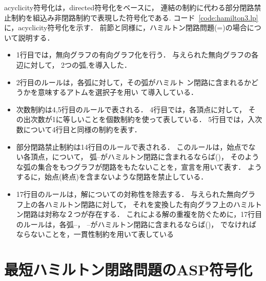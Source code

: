 \textsf{acyclicity}符号化は，\textsf{directed}符号化をベースに，
連結の制約に代わる部分閉路禁止制約を組込み非閉路制約で表現した符号化である.
コード~\ref{code:hamilton3.lp}に，\textsf{acyclicity}符号化を示す．
前節と同様に，ハミルトン閉路問題(=)の場合について説明する．

\begin{itemize}
\item 1行目では，無向グラフの有向グラフ化を行う．
  与えられた無向グラフの各辺に対して，
  2つの弧,を導入した．
\item 2行目のルールは，各弧に対して，その弧がハミルト
  ン閉路に含まれるかどうかを意味するアトムを選択子を用い
  て導入している．
\item 次数制約は4,5行目のルールで表される．
  4行目では，各頂点に対して，
  その出次数が1に等しいことを個数制約を使って表している．
  5行目では，入次数について4行目と同様の制約を表す．
\item 部分閉路禁止制約は14行目のルールで表される．
  このルールは，始点でない各頂点，について，
  弧--がハミルトン閉路に含まれるならば()，
  そのような弧の集合をもつグラフが閉路をもたないことを，宣言を用いて表す．
  ようするに，始点(終点)を含まないような閉路を禁止している．
\item 17行目のルールは，解についての対称性を除去する．
  与えられた無向グラフ上の各ハミルトン閉路に対して，
  それを変換した有向グラフ上のハミルトン閉路は対称な２つが存在する．
  これによる解の重複を防ぐために，17行目のルールは，各弧--，
  --がハミルトン閉路に含まれるならば()，
  でなければならないことを，一貫性制約を用いて表している
\end{itemize}

\section{最短ハミルトン閉路問題のASP符号化}\label{minexpl}





